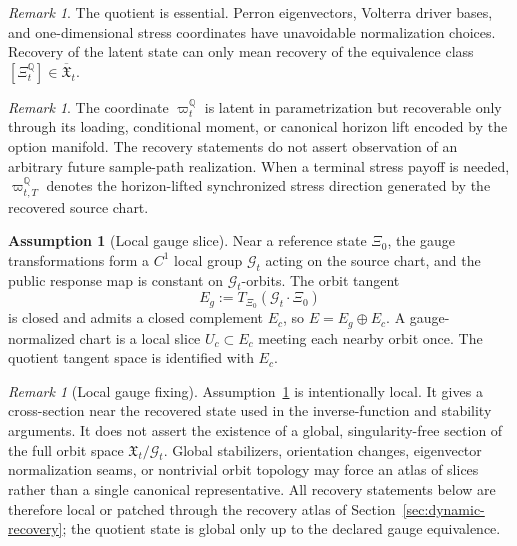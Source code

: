 \documentclass[11pt,a4paper]{amsart}
\theoremstyle{plain}
\theoremstyle{definition}
\newtheorem{assumption}[theorem]{Assumption}
\theoremstyle{remark}
\newtheorem{remark}[theorem]{Remark}
\newcommand{\QQ}{\mathbb{Q}}
\begin{document}
\begin{remark}
The quotient is essential.  Perron eigenvectors, Volterra driver bases, and one-dimensional
stress coordinates have unavoidable normalization choices.  Recovery of the latent state can only
mean recovery of the equivalence class \([\Xi_t^\QQ]\in\overline{\mathfrak X}_t\).
\end{remark}

\begin{remark}
The coordinate \(\varpi_t^\QQ\) is latent in parametrization but recoverable only through its loading,
conditional moment, or canonical horizon lift encoded by the option manifold.
The recovery statements do not assert observation of an arbitrary future sample-path realization.
When a terminal stress payoff is needed, \(\varpi_{t,T}^\QQ\) denotes the horizon-lifted synchronized
stress direction generated by the recovered source chart.
\end{remark}

\begin{assumption}[Local gauge slice]\label{ass:local-gauge-slice}
Near a reference state \(\Xi_0\), the gauge transformations form a \(C^1\) local group
\(\mathcal G_t\) acting on the source chart, and the public response map is constant on
\(\mathcal G_t\)-orbits.  The orbit tangent
\[
        E_g:=T_{\Xi_0}(\mathcal G_t\cdot\Xi_0)
\]
is closed and admits a closed complement \(E_c\), so \(E=E_g\oplus E_c\).  A gauge-normalized
chart is a local slice \(U_c\subset E_c\) meeting each nearby orbit once.  The quotient tangent
space is identified with \(E_c\).
\end{assumption}

\begin{remark}[Local gauge fixing]\label{rem:local-not-global-gauge}
Assumption~\ref{ass:local-gauge-slice} is intentionally local.  It gives a cross-section near
the recovered state used in the inverse-function and stability arguments.  It does not assert the
existence of a global, singularity-free section of the full orbit space
\(\mathfrak X_t/\mathcal G_t\).  Global stabilizers, orientation changes, eigenvector
normalization seams, or nontrivial orbit topology may force an atlas of slices rather than a
single canonical representative.  All recovery statements below are therefore local or patched
through the recovery atlas of Section~\ref{sec:dynamic-recovery}; the quotient state is global
only up to the declared gauge equivalence.
\end{remark}
\end{document}
